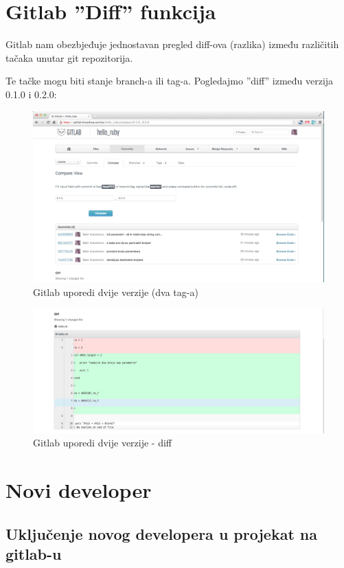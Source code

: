 \documentclass[times, utf8, seminar]{fit}
\begin{document}
\section{Gitlab ''Diff'' funkcija}

Gitlab nam obezbjeđuje jednostavan pregled diff-ova (razlika) između različitih tačaka unutar git repozitorija.

Te tačke mogu biti stanje branch-a ili tag-a. Pogledajmo ''diff'' između verzija 0.1.0 i 0.2.0:

\begin{figure}[H]
\centering
\includegraphics[width=15cm]{img/gitlab_compare.png}
\caption{Gitlab uporedi dvije verzije (dva tag-a)}
\end{figure}


\begin{figure}[H]
\centering
\includegraphics[width=15cm]{img/gitlab_compare_2.png}
\caption{Gitlab uporedi dvije verzije - diff}
\end{figure}


\section{Novi developer}

\subsection{Uključenje novog developera u projekat na gitlab-u}
\end{document}
